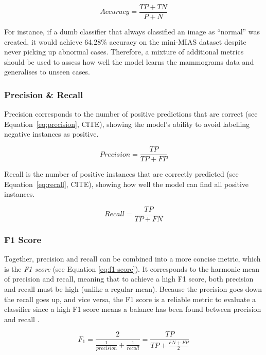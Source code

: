 \begin{equation}
\label{eq:accuracy}
    Accuracy = \frac{TP + TN}{P + N}
\end{equation}

For instance, if a dumb classifier that always classified an image as ``normal'' was created, it would achieve 64.28\% accuracy on the mini-MIAS dataset despite  never picking up abnormal cases. Therefore, a mixture of additional metrics should be used to assess how well the model learns the mammograms data and generalises to unseen cases.

\subsubsection{Precision \& Recall}

Precision corresponds to the number of positive predictions that are correct (see Equation~\ref{eq:precision}, CITE), showing the model's ability to avoid labelling negative instances as positive. 

\begin{equation}
\label{eq:precision}
    Precision = \frac{TP}{TP+FP}
\end{equation}

Recall is the number of positive instances that are correctly predicted (see Equation~\ref{eq:recall}, CITE), showing how well the model can find all positive instances.

\begin{equation}
\label{eq:recall}
    Recall = \frac{TP}{TP+FN}
\end{equation}

\subsubsection{F1 Score}

Together, precision and recall can be combined into a more concise metric, which is the \textit{F1 score} (see Equation \ref{eq:f1-score}). It corresponds to the harmonic mean of precision and recall, meaning that to achieve a high F1 score, both precision and recall must be high (unlike a regular mean). Because the precision goes down the recall goes up, and vice versa, the F1 score is a reliable metric to evaluate a classifier since a high F1 score means a balance has been found between precision and recall \citep{Geron2019}.

\begin{equation}
\label{eq:f1-score}
    F_{1} = \frac{2}{\frac{1}{precision} + \frac{1}{recall}} = \frac{TP}{TP+\frac{FN + FP}{2}}
\end{equation}

